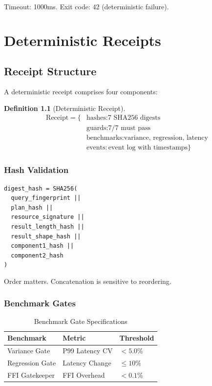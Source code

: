 \documentclass[12pt,oneside,a4paper]{book}
\theoremstyle{definition}
\newtheorem{definition}{Definition}[chapter]
\begin{document}
Timeout: 1000ms. Exit code: 42 (deterministic failure).

\chapter{Deterministic Receipts}
\label{ch:receipts}


\section{Receipt Structure}
\label{sec:receipt-structure}

A deterministic receipt comprises four components:

\begin{definition}[Deterministic Receipt]
\begin{align}
  \text{Receipt} = \{
    &\text{hashes}: \text{7 SHA256 digests} \\
    &\text{guards}: \text{7/7 must pass} \\
    &\text{benchmarks}: \text{variance, regression, latency} \\
    &\text{events}: \text{event log with timestamps}
  \}
\end{align}
\end{definition}

\subsection{Hash Validation}
\begin{lstlisting}
digest_hash = SHA256(
  query_fingerprint ||
  plan_hash ||
  resource_signature ||
  result_length_hash ||
  result_shape_hash ||
  component1_hash ||
  component2_hash
)
\end{lstlisting}

Order matters. Concatenation is sensitive to reordering.

\subsection{Benchmark Gates}
\begin{table}[h]
\centering
\begin{tabular}{lll}
\toprule
\textbf{Benchmark} & \textbf{Metric} & \textbf{Threshold} \\
\midrule
Variance Gate & P99 Latency CV & $< 5.0\%$ \\
Regression Gate & Latency Change & $\leq 10\%$ \\
FFI Gatekeeper & FFI Overhead & $< 0.1\%$ \\
\bottomrule
\end{tabular}
\caption{Benchmark Gate Specifications}
\label{tab:benchmark-gates}
\end{table}
\end{document}
